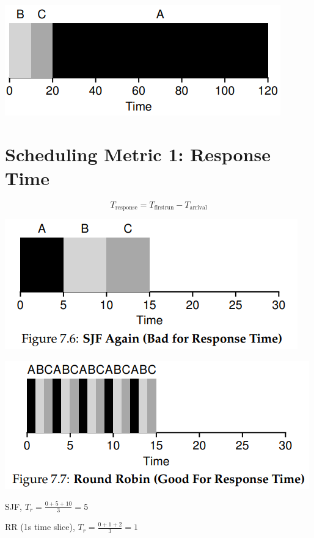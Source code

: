 \begin{minipage}{.5\linewidth}
  \includegraphics[width=\linewidth]{imgs/sched_fifo3}
\end{minipage}
\section*{Scheduling Metric 1: Response Time}
\begin{equation}
  \label{eq:reponse}
  T_{\text{response}} = T_{\text{firstrun}} - T_{\text{arrival}}
\end{equation}
\begin{minipage}{.5\linewidth}
  \includegraphics[width=\linewidth]{imgs/sched_rr1}
\end{minipage}
\begin{minipage}{.5\linewidth}
  \includegraphics[width=\linewidth]{imgs/sched_rr}
\end{minipage}
\begin{minipage}{.5\linewidth}
  \centering
  SJF, $T_{r} = \frac{0+5+10}{3} = 5$
\end{minipage}
\begin{minipage}{.5\linewidth}
  RR (1s time slice), $T_{r} = \frac{0+1+2}{3} = 1$
\end{minipage}
